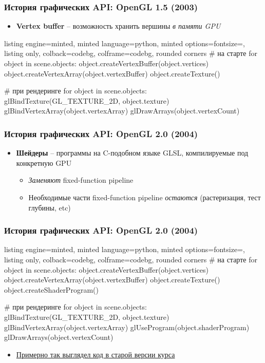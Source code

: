 \documentclass[10pt]{beamer}
\begin{document}
\begin{frame}[fragile]
\frametitle{История графических API: OpenGL 1.5 (2003)}
\begin{itemize}
\item \textbf{Vertex buffer} -- возможность хранить вершины \textit{в памяти GPU}
\end{itemize}
\pause
{}
\begin{tcblisting}{listing engine=minted, minted language=python, minted options={fontsize=\scriptsize}, listing only, colback=codebg, colframe=codebg, rounded corners}
# на старте
for object in scene.objects:
    object.createVertexBuffer(object.vertices)
    object.createVertexArray(object.vertexBuffer)
    object.createTexture()

# при рендеринге
for object in scene.objects:
    glBindTexture(GL_TEXTURE_2D, object.texture)
    glBindVertexArray(object.vertexArray)
    glDrawArrays(object.vertexCount)
\end{tcblisting}
\end{frame}

\begin{frame}
\frametitle{История графических API: OpenGL 2.0 (2004)}
\begin{itemize}
\item \textbf{Шейдеры} -- программы на C-подобном языке GLSL, компилируемые под конкретную GPU
\begin{itemize}
\item \textit{Заменяют} fixed-function pipeline
\item Необходимые части fixed-function pipeline \textit{остаются} (растеризация, тест глубины, etc)
\end{itemize}
\end{itemize}
\end{frame}

\begin{frame}[fragile]
\frametitle{История графических API: OpenGL 2.0 (2004)}
\begin{tcblisting}{listing engine=minted, minted language=python, minted options={fontsize=\scriptsize}, listing only, colback=codebg, colframe=codebg, rounded corners}
# на старте
for object in scene.objects:
    object.createVertexBuffer(object.vertices)
    object.createVertexArray(object.vertexBuffer)
    object.createTexture()
    object.createShaderProgram()

# при рендеринге
for object in scene.objects:
    glBindTexture(GL_TEXTURE_2D, object.texture)
    glBindVertexArray(object.vertexArray)
    glUseProgram(object.shaderProgram)
    glDrawArrays(object.vertexCount)
\end{tcblisting}
\pause
\begin{itemize}
\item \underline{Примерно так выглядел код в старой версии курса}
\end{itemize}
\end{frame}
\end{document}
